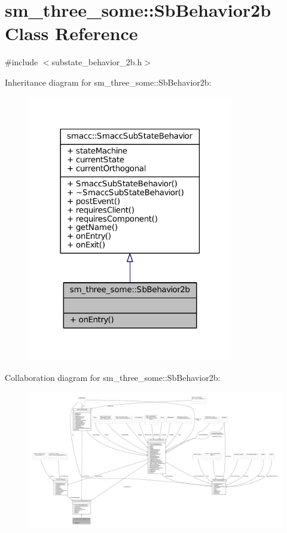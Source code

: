 \hypertarget{classsm__three__some_1_1SbBehavior2b}{}\section{sm\+\_\+three\+\_\+some\+:\+:Sb\+Behavior2b Class Reference}
\label{classsm__three__some_1_1SbBehavior2b}


{\ttfamily \#include $<$substate\+\_\+behavior\+\_\+2b.\+h$>$}



Inheritance diagram for sm\+\_\+three\+\_\+some\+:\+:Sb\+Behavior2b\+:
\nopagebreak
\begin{figure}[H]
\begin{center}
\leavevmode
\includegraphics[width=254pt]{classsm__three__some_1_1SbBehavior2b__inherit__graph}
\end{center}
\end{figure}


Collaboration diagram for sm\+\_\+three\+\_\+some\+:\+:Sb\+Behavior2b\+:
\nopagebreak
\begin{figure}[H]
\begin{center}
\leavevmode
\includegraphics[width=350pt]{classsm__three__some_1_1SbBehavior2b__coll__graph}
\end{center}
\end{figure}
